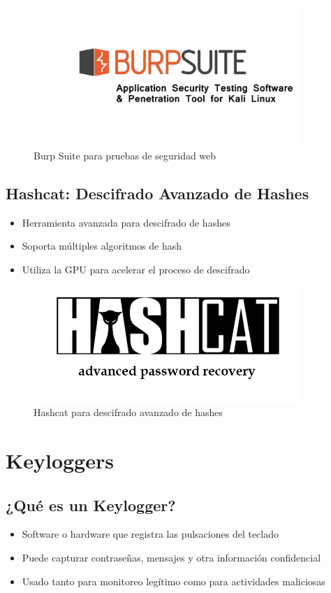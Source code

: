 \documentclass[12pt,a4paper]{article}
\begin{document}
\begin{figure}[H]
    \centering
    \includegraphics[width=0.9\textwidth]{burpsuite.png}
    \caption{Burp Suite para pruebas de seguridad web}
    \label{fig:burpsuite}
\end{figure}

\subsection{Hashcat: Descifrado Avanzado de Hashes}
\begin{itemize}
    \item Herramienta avanzada para descifrado de hashes
    \item Soporta múltiples algoritmos de hash
    \item Utiliza la GPU para acelerar el proceso de descifrado
\end{itemize}

\begin{figure}[H]
    \centering
    \includegraphics[width=0.9\textwidth]{hashcat.png}
    \caption{Hashcat para descifrado avanzado de hashes}
    \label{fig:hashcat}
\end{figure}

\section{Keyloggers}
\subsection{¿Qué es un Keylogger?}
\begin{itemize}
    \item Software o hardware que registra las pulsaciones del teclado
    \item Puede capturar contraseñas, mensajes y otra información confidencial
    \item Usado tanto para monitoreo legítimo como para actividades maliciosas
\end{itemize}
\end{document}
